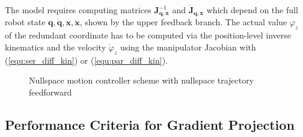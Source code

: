 \documentclass[runningheads]{llncs}
\newcommand{\bm}[1]{\boldsymbol{#1}}
\begin{document}
%
%
%
%
%

The model requires computing matrices $\bm{J}_{\bm{q},\bm{x}}^{-1}$ and 
$\dot{\bm{J}}_{\bm{q},\bm{x}}$ which depend on the full robot state $\bm{q},\dot{\bm{q}},\bm{x},\dot{\bm{x}}$, shown by the upper feedback branch.
The actual value $\varphi_z$ of the redundant coordinate has to be computed via the position-level inverse kinematics and the velocity $\dot{\varphi}_z$ using the manipulator Jacobian with (\ref{equ:ser_diff_kin}) or (\ref{equ:par_diff_kin}).

\begin{figure}[tb]
\centering

\caption{Nullspace motion controller scheme with nullspace trajectory feedforward}%
\label{fig:control_loop}
\end{figure}


\subsection{Performance Criteria for Gradient Projection}
\label{sec:trajik_perf}
\end{document}
